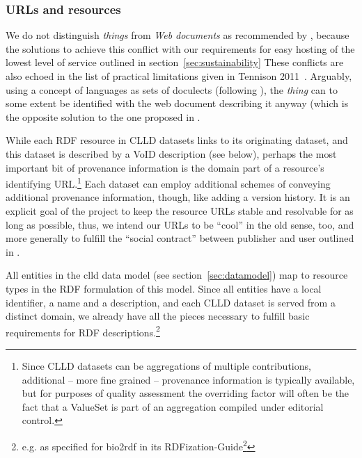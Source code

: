 \documentclass[a4paper,10pt]{article}
\begin{document}
\subsubsection{URLs and resources}
We do not distinguish \emph{things} from \emph{Web documents} as recommended by ,
because the solutions to achieve this conflict with our requirements for easy hosting of the lowest level
of service outlined in section~\ref{sec:sustainability}
These conflicts are also echoed in the list of practical limitations given in Tennison 2011~\cite{tennison2011}.
Arguably, using a concept of languages as sets of doculects (following ), the \emph{thing} can
to some extent be identified with the web document describing it anyway
(which is the opposite solution to the one proposed in .

While each RDF resource in CLLD datasets links to its originating
dataset, and this dataset is described by a VoID description (see below), perhaps the most
important bit of provenance information is the domain part of
a resource's identifying URL.\footnote{Since CLLD datasets can be aggregations of multiple
contributions, additional -- more fine grained -- provenance information is typically available,
but for purposes of quality assessment the overriding factor will often be the fact that a
ValueSet is part of an aggregation compiled under editorial control.} Each dataset can employ
additional schemes of conveying additional provenance information, though, like adding a version history.
It is an explicit goal of the project to keep the resource URLs stable and resolvable for
as long as possible, thus, we intend our URLs to be ``cool'' in the old sense, too, and more
generally to fulfill the ``social contract'' between publisher and user outlined in .

All entities in the clld data model (see section~\ref{sec:datamodel}) map to resource types
in the RDF formulation of this model. Since all entities have a local identifier, a name
and a description, and each CLLD dataset is served from a distinct domain,
we already have all the pieces necessary to fulfill basic requirements for RDF
descriptions.\footnote{e.g. as specified for bio2rdf in its
RDFization-Guide\footnote{https://github.com/bio2rdf/bio2rdf-scripts/wiki/RDFization-Guide}}
\end{document}
